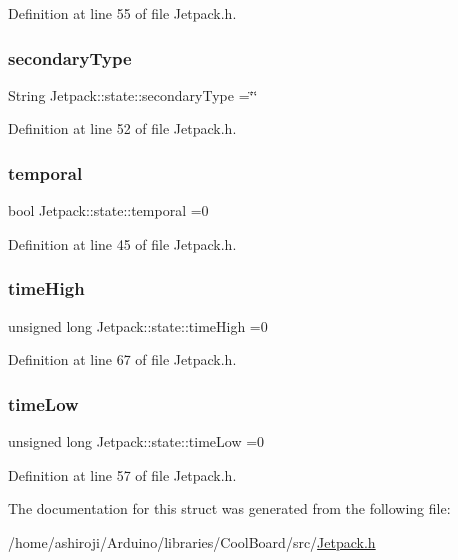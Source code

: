 Definition at line 55 of file Jetpack.\+h.

\mbox{\label{struct_jetpack_1_1state_a81cf9af139da095b7d91e2a87e50135b}} 
\subsubsection{\texorpdfstring{secondary\+Type}{secondaryType}}
{\footnotesize\ttfamily String Jetpack\+::state\+::secondary\+Type =\char`\"{}\char`\"{}}



Definition at line 52 of file Jetpack.\+h.

\mbox{\label{struct_jetpack_1_1state_abd6039e7a48856550b0ffbf8bcff7bdd}} 
\subsubsection{\texorpdfstring{temporal}{temporal}}
{\footnotesize\ttfamily bool Jetpack\+::state\+::temporal =0}



Definition at line 45 of file Jetpack.\+h.

\mbox{\label{struct_jetpack_1_1state_a97c594b20b03b46ae0a6ac544f5d6c8d}} 
\subsubsection{\texorpdfstring{time\+High}{timeHigh}}
{\footnotesize\ttfamily unsigned long Jetpack\+::state\+::time\+High =0}



Definition at line 67 of file Jetpack.\+h.

\mbox{\label{struct_jetpack_1_1state_ae544475d627308218e355a8dbb28ac74}} 
\subsubsection{\texorpdfstring{time\+Low}{timeLow}}
{\footnotesize\ttfamily unsigned long Jetpack\+::state\+::time\+Low =0}



Definition at line 57 of file Jetpack.\+h.



The documentation for this struct was generated from the following file\+:\begin{DoxyCompactItemize}
\item 
/home/ashiroji/\+Arduino/libraries/\+Cool\+Board/src/\hyperlink{_jetpack_8h}{Jetpack.\+h}\end{DoxyCompactItemize}
